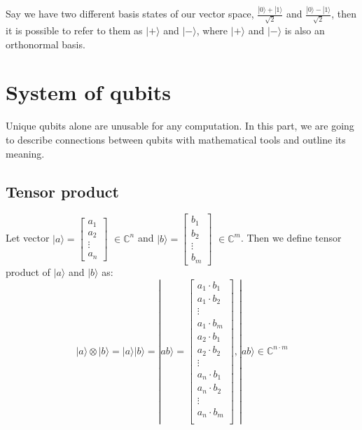 Say we have two different basis states of our vector space, $\frac{|0\rangle + |1\rangle}{\sqrt{2}}$ and $ \frac{|0\rangle - |1\rangle}{\sqrt{2}}$, then it is possible to refer to them as $|+\rangle$ and $|-\rangle$, where $|+\rangle$ and $|-\rangle$ is also an orthonormal basis.



\section{System of qubits}

Unique qubits alone are unusable for any computation. In this part, we are going to describe connections between qubits with mathematical tools and outline its meaning.

\subsection{Tensor product}
 Let vector $ |a\rangle =
%
%
\begin{bmatrix}
     a_1\\
     a_2\\
     \vdots\\
     a_n
\end{bmatrix}$ 
%
%
$\in \mathbb{C}^n $ and 
%
%
$ |b\rangle =
\begin{bmatrix}
     b_1\\
     b_2\\
     \vdots\\
     b_m
\end{bmatrix}$ $\in \mathbb{C}^m$. 
Then we define tensor product of $|a\rangle$ and $|b\rangle$ as: 
\begin{equation}
|a\rangle \otimes |b\rangle = |a\rangle |b\rangle = |ab\rangle =\begin{bmatrix}
     a_1 \cdot b_1\\
     a_1 \cdot b_2\\
     \vdots\\
     a_1 \cdot b_m\\
     a_2 \cdot b_1\\
     a_2 \cdot b_2\\
     \vdots\\
     a_n \cdot b_1\\
     a_n \cdot b_2\\
     \vdots\\
     a_n \cdot b_m\\
\end{bmatrix}
, |ab\rangle \in \mathbb{C}^{n \cdot m} 
\end{equation}

